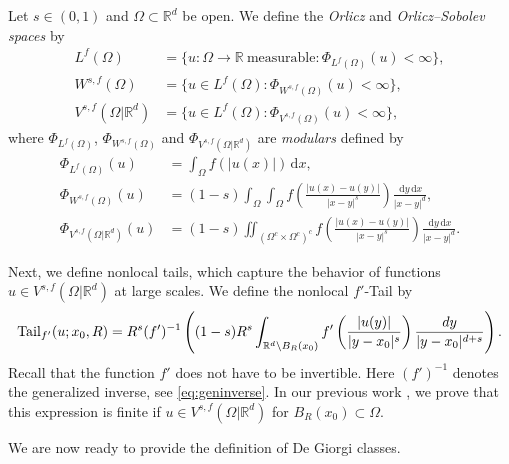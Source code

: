 \documentclass[11pt]{amsart}
\theoremstyle{plain}
\theoremstyle{definition}
\numberwithin{equation}{section}
\renewcommand{\d}{\textnormal{d}}
\newcommand{\dx} {\,\mathrm{d}x}
\newcommand{\dy} {\,\mathrm{d}y}
\newcommand{\R}{\mathbb{R}}
\newcommand{\Rd}{\mathbb{R}^d}
\begin{document}
Let $s \in (0, 1)$ and $\Omega \subset \Rd$ be open. We define the {\it Orlicz} and {\it Orlicz--Sobolev spaces} by
\begin{equation*}
\begin{split}
L^f(\Omega) &= \lbrace u: \Omega \to \R ~\text{measurable}: \Phi_{L^f(\Omega)}(u) < \infty \rbrace, \\
W^{s, f}(\Omega) &= \lbrace u \in L^f(\Omega): \Phi_{W^{s, f}(\Omega)}(u) < \infty \rbrace,\\
V^{s, f}(\Omega|\Rd) &= \lbrace u \in L^f(\Omega): \Phi_{V^{s, f}(\Omega)}(u) < \infty \rbrace,
\end{split}
\end{equation*}
where $\Phi_{L^f(\Omega)}$, $\Phi_{W^{s, f}(\Omega)}$ and $\Phi_{V^{s,f}(\Omega|\Rd)}$ are {\it modulars} defined by
\begin{equation*}
\begin{split}
\Phi_{L^f(\Omega)}(u) &= \int_{\Omega} f(|u(x)|) \dx, \\
\Phi_{W^{s,f}(\Omega)}(u) &= (1-s)\int_{\Omega} \int_{\Omega} f\left( \frac{|u(x)-u(y)|}{|x-y|^s} \right) \frac{\dy \dx}{\vert x-y \vert^{d}} ,\\
\Phi_{V^{s,f}(\Omega|\Rd)}(u) &= (1-s)\iint_{(\Omega^c \times \Omega^c)^c} f\left( \frac{|u(x)-u(y)|}{|x-y|^s} \right) \frac{\dy \dx}{\vert x-y \vert^{d}} .
\end{split}
\end{equation*}

Next, we define nonlocal tails, which capture the behavior of functions $u\in V^{s, f}(\Omega|\Rd)$ at large scales. 
We define the nonlocal $f'$-Tail by
\begin{equation}\label{eq:tail}
\mathrm{Tail}_{f'}(u; x_0, R) = R^s (f')^{-1} \left( (1-s)R^s \int_{\Rd \setminus B_R(x_0)} f' \left( \frac{|u(y)|}{|y-x_0|^s} \right) \frac{\d y}{|y-x_0|^{d+s}} \right).
\end{equation}
Recall that the function $f'$ does not have to be invertible. Here $(f')^{-1} $ denotes the generalized inverse, see \eqref{eq:geninverse}.
In our previous work \cite{ChKiWe21}, we prove that this expression is finite if $u\in V^{s, f}(\Omega|\Rd)$ for $B_R(x_0)\subset\Omega$.

We are now ready to provide the definition of De Giorgi classes.
\end{document}
